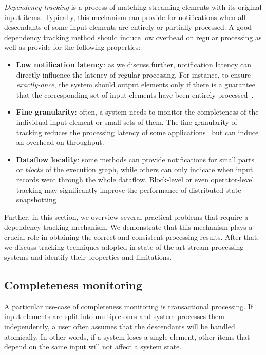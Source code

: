 {\em Dependency tracking} is a process of matching streaming elements with its original input items. Typically, this mechanism can provide for notifications when all descendants of some input elements are entirely or partially processed. A good dependency tracking method should induce low overhead on regular processing as well as provide for the following properties:
\begin{itemize}
    \item {\bf Low notification latency}: as we discuss further, notification latency can directly influence the latency of regular processing. For instance, to ensure {\em exactly-once}, the system should output elements only if there is a guarantee that the corresponding set of input elements have been entirely processed~\cite{thepaper}.
    \item {\bf Fine granularity}: often, a system needs to monitor the completeness of the individual input element or small sets of them. The fine granularity of tracking reduces the processing latency of some applications~\cite{we2018adbis} but can induce an overhead on throughput.
    \item {\bf Dataflow locality}: some methods can provide notifications for small parts or {\em blocks} of the execution graph, while others can only indicate when input records went through the whole dataflow. Block-level or even operator-level tracking may significantly improve the performance of distributed state snapshotting~\cite{Carbone:2017:SMA:3137765.3137777, 2015arXiv150608603C}.
\end{itemize}

Further, in this section, we overview several practical problems that require a dependency tracking mechanism. We demonstrate that this mechanism plays a crucial role in obtaining the correct and consistent processing results. After that, we discuss tracking techniques adopted in state-of-the-art stream processing systems and identify their properties and limitations. 

\subsection{Completeness monitoring}

A particular use-case of completeness monitoring is transactional processing. If input elements are split into multiple ones and system processes them independently, a user often assumes that the descendants will be handled atomically. In other words, if a system loses a single element, other items that depend on the same input will not affect a system state. 

